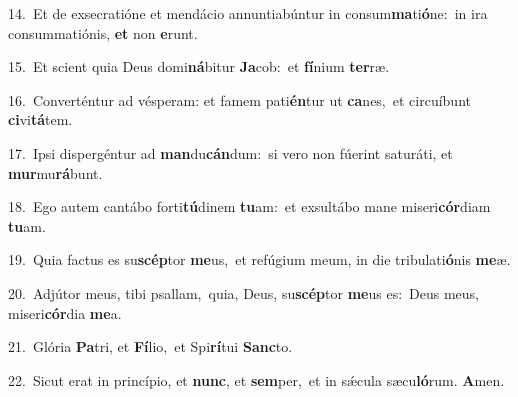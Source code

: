 {\numbfont\textcolor{\numbcolor}{14.}}~Et de exsecratióne et mendácio annuntiabúntur in consum\-\textbf{ma}\-ti\-\textbf{ó}\-ne:~\star in ira consummatiónis, \textbf{et} non \textbf{e}\-runt.\par
{\numbfont\textcolor{\numbcolor}{15.}}~Et scient quia Deus domi\-\textbf{ná}\-bitur \textbf{Ja}\-cob:~\star et \textbf{fí}\-nium \textbf{ter}\-ræ.\par
{\numbfont\textcolor{\numbcolor}{16.}}~Converténtur ad vésperam: et famem pati\-\textbf{én}\-tur ut \textbf{ca}\-nes,~\star et circuíbunt \textbf{ci}\-vi\-\textbf{tá}\-tem.\par
{\numbfont\textcolor{\numbcolor}{17.}}~Ipsi dispergéntur ad \textbf{man}\-du\-\textbf{cán}\-dum:~\star si vero non fúerint saturáti, et \textbf{mur}\-mu\-\textbf{rá}\-bunt.\par
{\numbfont\textcolor{\numbcolor}{18.}}~Ego autem cantábo forti\-\textbf{tú}\-dinem \textbf{tu}\-am:~\star et exsultábo mane miseri\-\textbf{cór}\-diam \textbf{tu}\-am.\par
{\numbfont\textcolor{\numbcolor}{19.}}~Quia factus es su\-\textbf{scép}\-tor \textbf{me}\-us,~\star et refúgium meum, in die tribulati\-\textbf{ó}\-nis \textbf{me}\-æ.\par
{\numbfont\textcolor{\numbcolor}{20.}}~Adjútor meus, tibi psallam,~\dagger quia, Deus, su\-\textbf{scép}\-tor \textbf{me}\-us es:~\star Deus meus, miseri\-\textbf{cór}\-dia \textbf{me}\-a.\par
{\numbfont\textcolor{\numbcolor}{21.}}~Glória \textbf{Pa}\-tri, et \textbf{Fí}\-lio,~\star et Spi\-\textbf{rí}\-tui \textbf{Sanc}\-to.\par
{\numbfont\textcolor{\numbcolor}{22.}}~Sicut erat in princípio, et \textbf{nunc}\-, et \textbf{sem}\-per,~\star et in sǽcula sæcu\-\textbf{ló}\-rum. \textbf{A}\-men.\par
